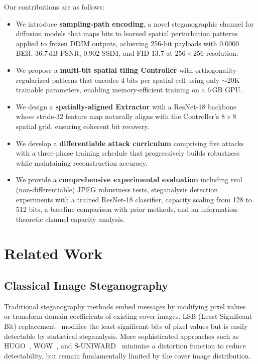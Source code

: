 \documentclass[10pt, twocolumn]{article}
\begin{document}
Our contributions are as follows:
\begin{itemize}[itemsep=2pt, topsep=2pt]
    \item We introduce \textbf{sampling-path encoding}, a novel steganographic channel for diffusion models that maps bits to learned spatial perturbation patterns applied to frozen DDIM outputs, achieving 256-bit payloads with $0.0000$ BER, $36.7$\,dB PSNR, $0.902$ SSIM, and FID $13.7$ at $256\times256$ resolution.

    \item We propose a \textbf{multi-bit spatial tiling Controller} with orthogonality-regularized patterns that encodes 4 bits per spatial cell using only $\sim$20K trainable parameters, enabling memory-efficient training on a 6\,GB GPU.

    \item We design a \textbf{spatially-aligned Extractor} with a ResNet-18 backbone whose stride-32 feature map naturally aligns with the Controller's $8\times8$ spatial grid, ensuring coherent bit recovery.

    \item We develop a \textbf{differentiable attack curriculum} comprising five attacks with a three-phase training schedule that progressively builds robustness while maintaining reconstruction accuracy.

    \item We provide a \textbf{comprehensive experimental evaluation} including real (non-differentiable) JPEG robustness tests, steganalysis detection experiments with a trained ResNet-18 classifier, capacity scaling from 128 to 512 bits, a baseline comparison with prior methods, and an information-theoretic channel capacity analysis.
\end{itemize}


\section{Related Work}
\label{sec:related}

\subsection{Classical Image Steganography}

Traditional steganography methods embed messages by modifying pixel values~\cite{cox2007digital} or transform-domain coefficients of existing cover images.
LSB (Least Significant Bit) replacement~\cite{chan2004hiding} modifies the least significant bits of pixel values but is easily detectable by statistical steganalysis.
More sophisticated approaches such as HUGO~\cite{pevny2010using}, WOW~\cite{holub2012designing}, and S-UNIWARD~\cite{holub2014universal} minimize a distortion function to reduce detectability, but remain fundamentally limited by the cover image distribution.
\end{document}
